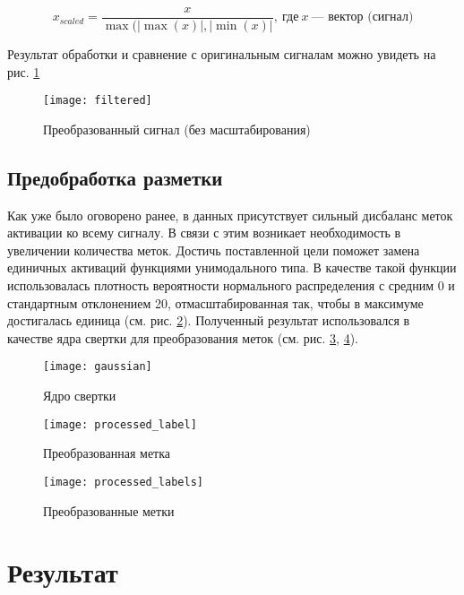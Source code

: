 \begin{equation} \label{eq:scaling}
	x_{scaled} = \frac{x}{\max(|\max(x)|, |\min(x)|}, \: \text{где} \: x \: \text{--- вектор (сигнал)}
\end{equation}

\noindent Результат обработки и сравнение с оригинальным сигналам можно увидеть
на рис. \ref{fig:filtered}

\begin{figure}[!htb]
	\centering
	\texttt{[image: filtered]}
	\caption{Преобразованный сигнал (без масштабирования)}
	\label{fig:filtered}
\end{figure}

\subsection{Предобработка разметки} Как уже было оговорено ранее, в данных
присутствует сильный дисбаланс меток активации ко всему сигналу. В связи с этим
возникает необходимость в увеличении количества меток. Достичь поставленной
цели поможет замена единичных активаций функциями унимодального типа. В
качестве такой функции использовалась плотность вероятности нормального
распределения с средним 0 и стандартным отклонением 20, отмасштабированная так,
чтобы в максимуме достигалась единица (см. рис. \ref{fig:gaussian}). Полученный
результат использовался в качестве ядра свертки для преобразования меток (см.
рис. \ref{fig:processed-label}, \ref{fig:processed-labels}).


\begin{figure}[!htb]
	\centering
	\texttt{[image: gaussian]}
	\caption{Ядро свертки}
	\label{fig:gaussian}
\end{figure}

\begin{figure}[!htb]
	\centering
	\texttt{[image: processed\_label]}
	\caption{Преобразованная метка}
	\label{fig:processed-label}
\end{figure}

\begin{figure}[!htb]
	\centering
	\texttt{[image: processed\_labels]}
	\caption{Преобразованные метки}
	\label{fig:processed-labels}
\end{figure}


\section{Результат}


